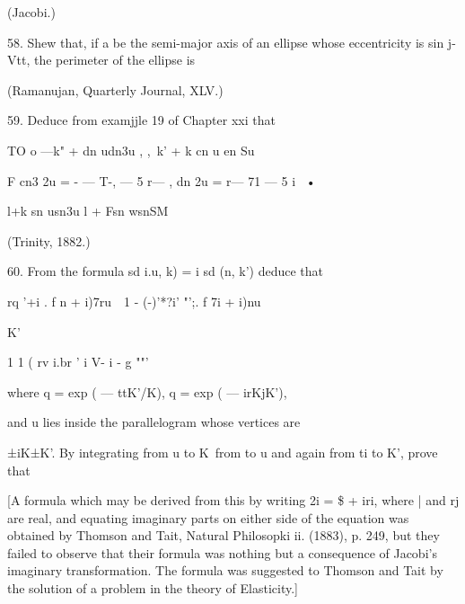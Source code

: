 (Jacobi.)

58. Shew that, if a be the semi-major axis of an ellipse whose
eccentricity is sin j-Vtt, the perimeter of the ellipse is

(Ramanujan, Quarterly Journal, XLV.)

59. Deduce from examjjle 19 of Chapter xxi that

TO o —k" + dn udn3u , ,\ k' + k cn u en Su

F cn3 2u = - — T-, — 5 r— , dn 2u = r— 71 — 5 i~ •

l+k sn usn3u l + Fsn wsnSM

(Trinity, 1882.)

60. From the formula sd i.u, k) = i sd (n, k') deduce that

rq '+i . f n + i)7ru\ \ 1 - (-)'*?i' "';. f 7i + i)nu

K'

1 1 ( rv i.br ' i V- i - g ""'

where q = exp ( — ttK'/K), q = exp ( — irKjK'),

and u lies inside the parallelogram whose vertices are

±iK±K'. By integrating from u to K\ from to u and again from ti to K',
prove that

[A formula which may be derived from this by writing 2i = \$ + iri,
where | and rj are real, and equating imaginary parts on either side
of the equation was obtained by Thomson and Tait, Natural Philosopki
ii. (1883), p. 249, but they failed to observe that their formula was
nothing but a consequence of Jacobi's imaginary transformation. The
formula was suggested to Thomson and Tait by the solution of a problem
in the theory of Elasticity.]

